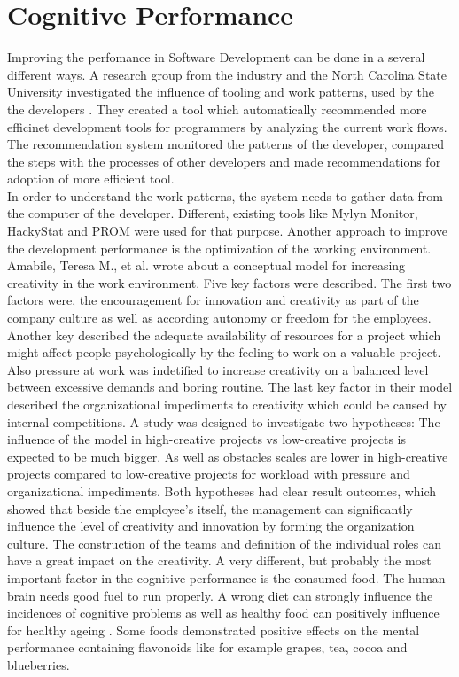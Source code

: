 \section{Cognitive Performance}
Improving the perfomance in Software Development can be done in a several different ways. A research group from the industry and the North Carolina State University investigated the influence of tooling and work patterns, used by the the developers \cite{snipes2013towards}. They created a tool which automatically recommended more efficinet development tools for programmers by analyzing the current work flows. The recommendation system monitored the patterns of the developer, compared the steps with the processes of other developers and made recommendations for adoption of more efficient tool.\\
In order to understand the work patterns, the system needs to gather data from the computer of the developer. Different, existing tools like Mylyn Monitor, HackyStat and PROM were used for that purpose.
\bigbreak
Another approach to improve the development performance is the optimization of the working environment. Amabile, Teresa M., et al. \cite{amabile1996assessing} wrote about a conceptual model for increasing creativity in the work environment. Five key factors were described. The first two factors were, the encouragement for innovation and creativity as part of the company culture as well as according autonomy or freedom for the employees. Another key described the adequate availability of resources for a project which might affect people psychologically by the feeling to work on a valuable project. Also pressure at work was indetified to increase creativity on a balanced level between excessive demands and boring routine. The last key factor in their model described the organizational impediments to creativity which could be caused by internal competitions.
A study was designed to investigate two hypotheses: The influence of the model in high-creative projects vs low-creative projects is expected to be much bigger. As well as obstacles scales are lower in high-creative projects compared to low-creative projects for workload with pressure and organizational impediments.
Both hypotheses had clear result outcomes, which showed that beside the employee's itself, the management can significantly influence the level of creativity and innovation by forming the organization culture. The construction of the teams and definition of the individual roles can have a great impact on the creativity. 
A very different, but probably the most important factor in the cognitive performance is the consumed food. The human brain needs good fuel to run properly. A wrong diet can strongly influence the incidences of cognitive problems as well as healthy food can positively influence for healthy ageing \cite{spencer2008food}. Some foods demonstrated positive effects on the mental performance containing flavonoids like for example grapes, tea, cocoa and blueberries. 
